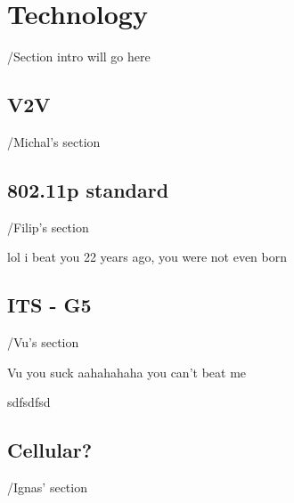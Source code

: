 \section{Technology}

/Section intro will go here

\subsection{V2V}

/Michal's section




\subsection{802.11p standard}

/Filip's section

lol
i beat you 22 years ago, you were not even born



\subsection{ITS - G5}

/Vu's section

Vu you suck
aahahahaha
you can't beat me

sdfsdfsd




\subsection{Cellular?}

/Ignas' section

